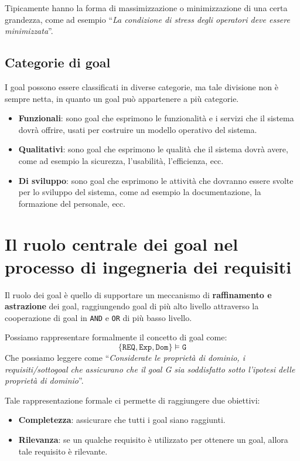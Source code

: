 Tipicamente hanno la forma di massimizzazione o minimizzazione di una certa grandezza, 
come ad esempio ``\textit{La condizione di stress degli operatori deve essere minimizzata}''.

\subsection{Categorie di goal}
I goal possono essere classificati in diverse categorie, ma tale divisione non è
sempre netta, in quanto un goal può appartenere a più categorie.
\begin{itemize}
    \item \textbf{Funzionali}: sono goal che esprimono le funzionalità e i servizi che 
    il sistema dovrà offrire, usati per costruire un modello operativo del sistema.
    \item \textbf{Qualitativi}: sono goal che esprimono le qualità che il sistema dovrà
    avere, come ad esempio la sicurezza, l'usabilità, l'efficienza, ecc.
    \item \textbf{Di sviluppo}: sono goal che esprimono le attività che dovranno essere
    svolte per lo sviluppo del sistema, come ad esempio la documentazione, la formazione
    del personale, ecc.
\end{itemize}
\section{Il ruolo centrale dei goal nel processo di ingegneria dei requisiti}
Il ruolo dei goal è quello di supportare un meccanismo di \textbf{raffinamento e astrazione} 
dei goal, raggiungendo goal di più alto livello attraverso la cooperazione di goal in 
\texttt{AND} e \texttt{OR} di più basso livello.

Possiamo rappresentare formalmente il concetto di goal come:
\[
\{\texttt{REQ}, \texttt{Exp}, \texttt{Dom} \} \models \texttt{G} 
\]
Che possiamo leggere come ``\textit{Considerate le proprietà 
di dominio, i requisiti/sottogoal che assicurano che il goal G sia soddisfatto sotto 
l'ipotesi delle proprietà di dominio}''.

Tale rappresentazione formale ci permette di raggiungere due obiettivi:
\begin{itemize}
    \item \textbf{Completezza}: assicurare che tutti i goal siano raggiunti.
    \item \textbf{Rilevanza}: se un qualche requisito è utilizzato per ottenere 
    un goal, allora tale requisito è rilevante.
\end{itemize}

